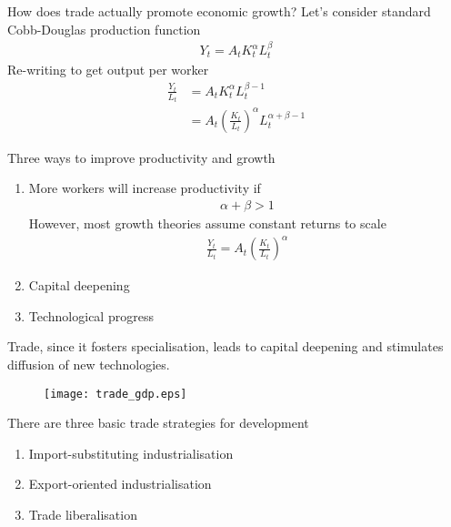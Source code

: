 \documentclass{beamer}
\begin{document}
\begin{frame}
 How does trade actually promote economic growth?
 Let's consider standard Cobb-Douglas production function
 \begin{align*}
   Y_t=A_tK_t^{\alpha}L_t^{\beta}
 \end{align*}
 Re-writing to get output per worker
 \begin{align*}
   \frac{Y_t}{L_t}&=A_tK_t^{\alpha}L_t^{\beta-1} 
      \\ &= A_t \left( \frac{K_t}{L_t} \right)^{\alpha} L_t^{\alpha+\beta-1} 
 \end{align*}
\end{frame}

\begin{frame}
  Three ways to improve productivity and growth
  \begin{enumerate}
    \item More workers will increase productivity if 
    \begin{align*}
       \alpha+\beta>1
     \end{align*} 
     However, most growth theories assume constant returns to scale    
    \begin{align*}
      \frac{Y_t}{L_t}=A_t \left( \frac{K_t}{L_t} \right)^{\alpha}
    \end{align*}
    \item Capital deepening
    \item Technological progress
  \end{enumerate}
  \medskip
  Trade, since it fosters specialisation, leads to capital deepening and stimulates diffusion of new technologies.
\end{frame}

\begin{frame}
  \begin{figure}
    \texttt{[image: trade\_gdp.eps]}
  \end{figure}
\end{frame}

\begin{frame}
There are three basic trade strategies for development
 \begin{enumerate}
   \item Import-substituting industrialisation
   \item Export-oriented industrialisation
   \item Trade liberalisation 
 \end{enumerate}
\end{frame}
\end{document}
